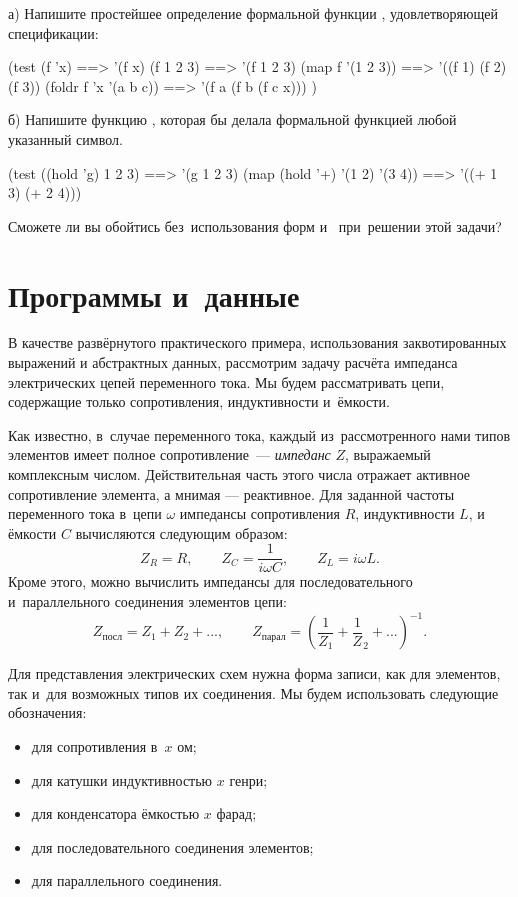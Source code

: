\begin{Assignment}
а) Напишите простейшее определение формальной функции , удовлетворяющей спецификации:
\begin{Specification}
(test 
  (f 'x)                ==> '(f x)
  (f 1 2 3)             ==> '(f 1 2 3)
  (map f '(1 2 3))      ==> '((f 1) (f 2) (f 3))
  (foldr f 'x '(a b c)) ==> '(f a (f b (f c x))) )
\end{Specification}

б) Напишите функцию , которая бы делала формальной функцией любой указанный символ. 
\begin{Specification}
(test 
 ((hold 'g) 1 2 3)             ==> '(g 1 2 3)
 (map (hold '+) '(1 2) '(3 4)) ==> '((+ 1 3) (+ 2 4)))
\end{Specification}

Сможете ли вы обойтись без~использования форм  и~ при~решении этой задачи?
\end{Assignment}


\section{Программы и~данные}%
В качестве развёрнутого практического примера, использования заквотированных выражений и абстрактных данных, рассмотрим задачу расчёта импеданса электрических цепей переменного тока. Мы будем рассматривать цепи, содержащие только сопротивления, индуктивности и~ёмкости.

Как известно, в~случае переменного тока, каждый из~рассмотренного нами типов элементов имеет полное сопротивление~--- \emph{импеданс} $Z$, выражаемый комплексным числом. Действительная часть этого числа отражает активное сопротивление элемента, а мнимая --- реактивное. Для заданной частоты переменного тока в~цепи $\omega$ импедансы сопротивления $R$, индуктивности $L$, и ёмкости $C$ вычисляются следующим образом:
$$Z_R = R,\qquad Z_C = \frac{1}{i \omega C},\qquad Z_L = i\omega L.$$
Кроме этого, можно вычислить импедансы для последовательного и~параллельного соединения элементов цепи:
$$Z_\text{посл} = Z_1 + Z_2 +...,\qquad  Z_\text{парал}= \left(\frac1{Z_1} + \frac1Z_2 +...\right)^{-1}.$$

Для представления электрических схем нужна форма записи, как для элементов, так и~для возможных типов их соединения. Мы будем использовать следующие обозначения:

\begin{itemize}
 \item[]  для сопротивления в~$x$ ом;

 \item[]  для катушки индуктивностью $x$ генри;

 \item[]  для конденсатора ёмкостью $x$ фарад;

 \item[]  для последовательного соединения элементов;

 \item[]  для параллельного соединения.
\end{itemize}

